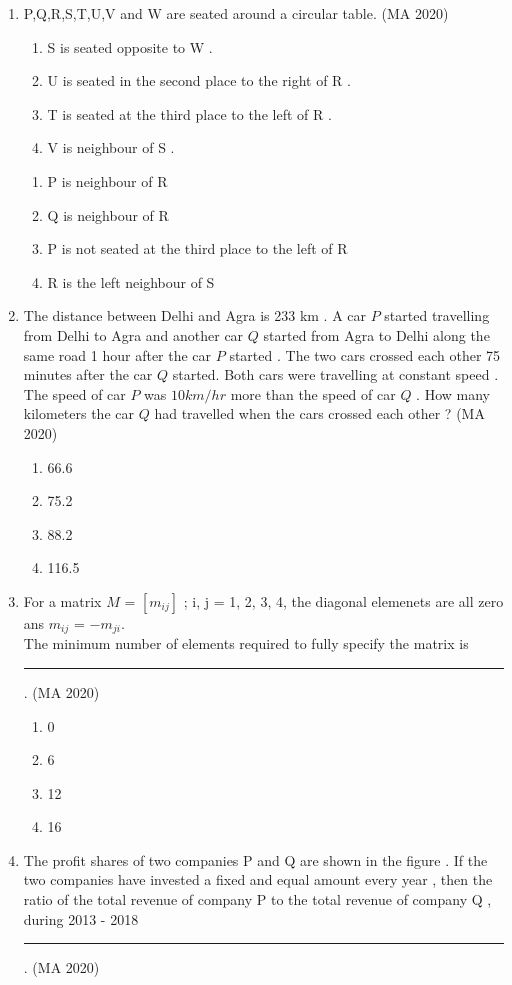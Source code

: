 \documentclass[journal,12pt,onecolumn]{IEEEtran}
\theoremstyle{remark}
\begin{document}
\begin{enumerate}
\item P,Q,R,S,T,U,V and W are seated around a circular table.
\hfill{(MA 2020)}
\begin{enumerate}
\item S is seated opposite to W .
\item U is seated in the second place to the right of R .
\item T is seated at the third place to the left of R .
\item V is neighbour of S .
\end{enumerate}

\begin{enumerate}
\item P is neighbour of R
\item Q is neighbour of R
\item P is not seated at the third place to the left of R
\item R is the left neighbour of S 
\end{enumerate}

\item The distance between Delhi and Agra is 233 km . A car $P$ started travelling from Delhi to Agra and another car $Q$ started from Agra to Delhi along the same road 1 hour after the car $P$ started . The two cars crossed each other 75 minutes after the car $Q$ started. Both cars were travelling at constant speed . The speed of car $P$ was $10 km/hr$ more than the speed of car $Q$ . How many kilometers the car $Q$ had travelled when the cars crossed each other ? 
\hfill{(MA 2020)}
\begin{enumerate}
\item 66.6
\item 75.2
\item 88.2
\item 116.5
\end{enumerate}
\item For a matrix $M$ = $[m_{ij}]$ ; i, j = 1, 2, 3, 4, the diagonal elemenets are all zero ans $m_{ij}$ = $-m_{ji}$.\\The minimum number of elements required to fully specify the matrix is \rule{2cm}{0.4pt}.
\hfill{(MA 2020)}
\begin{enumerate}
\item 0
\item 6
\item 12
\item 16
\end{enumerate}

\item The profit shares of two companies P and Q are shown in the figure . If the two companies have invested a fixed and equal amount every year , then the ratio of the total revenue of company P to the total revenue of company Q , during 2013 - 2018 \rule{2cm}{0.4pt}.
\hfill{(MA 2020)}


\end{enumerate}
\end{document}
